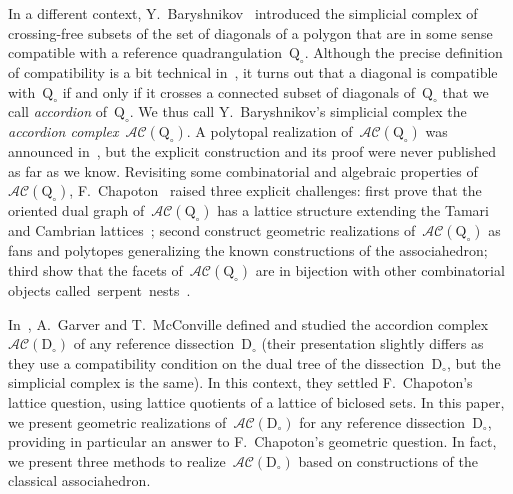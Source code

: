 \documentclass{amsart}
\theoremstyle{definition}
\newcommand{\darkblue}{\color{darkblue}} %
\newcommand{\defn}[1]{\textsl{\darkblue #1}} %
\newcommand{\accordionComplex}{\mathcal{AC}} %
\newcommand{\quadrangulation}{\mathrm{Q}} %
\newcommand{\dissection}{\mathrm{D}} %
\begin{document}
In a different context, Y.~Baryshnikov~\cite{Baryshnikov} introduced the simplicial complex of crossing-free subsets of the set of diagonals of a polygon that are in some sense compatible with a reference quadrangulation~$\quadrangulation_\circ$. Although the precise definition of compatibility is a bit technical in~\cite{Baryshnikov}, it turns out that a diagonal is compatible with~$\quadrangulation_\circ$ if and only if it crosses a connected subset of diagonals of~$\quadrangulation_\circ$ that we call \defn{accordion} of~$\quadrangulation_\circ$. We thus call Y.~Baryshnikov's simplicial complex the \defn{accordion complex}~$\accordionComplex(\quadrangulation_\circ)$. A polytopal realization of~$\accordionComplex(\quadrangulation_\circ)$ was announced in~\cite{Baryshnikov}, but the explicit construction and its proof were never published as far as we know. Revisiting some combinatorial and algebraic properties of~$\accordionComplex(\quadrangulation_\circ)$, F.~Chapoton~\cite{Chapoton-quadrangulations} raised three explicit challenges: first prove that the oriented dual graph of~$\accordionComplex(\quadrangulation_\circ)$ has a lattice structure extending the Tamari and Cambrian lattices~\cite{TamariFestschrift, Reading-CambrianLattices}; second construct geometric realizations of~$\accordionComplex(\quadrangulation_\circ)$ as fans and polytopes generalizing the known constructions of the associahedron; third show that the facets of~$\accordionComplex(\quadrangulation_\circ)$ are in bijection with other combinatorial objects \mbox{called serpent nests}~\cite{Chapoton-quadrangulations}.

In~\cite{GarverMcConville}, A.~Garver and T.~McConville defined and studied the accordion complex~$\accordionComplex(\dissection_\circ)$ of any reference dissection~$\dissection_\circ$ (their presentation slightly differs as they use a compatibility condition on the dual tree of the dissection~$\dissection_\circ$, but the simplicial complex is the same). In this context, they settled F.~Chapoton's lattice question, using lattice quotients of a lattice of biclosed sets. In this paper, we present geometric realizations of~$\accordionComplex(\dissection_\circ)$ for any reference dissection~$\dissection_\circ$, providing in particular an answer to F.~Chapoton's geometric question. In fact, we present three methods to realize~$\accordionComplex(\dissection_\circ)$ based on constructions of the classical associahedron.
\end{document}
